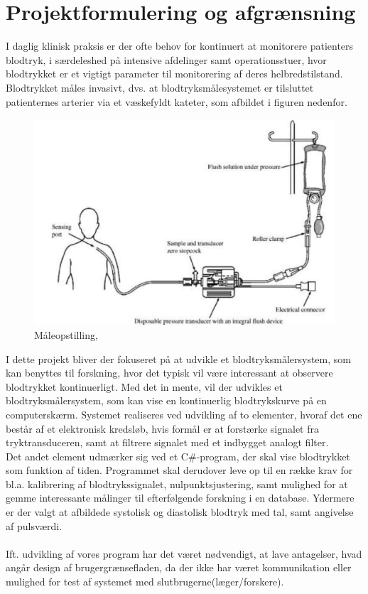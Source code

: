 \chapter{Projektformulering og afgrænsning}
I daglig klinisk praksis er der ofte behov for kontinuert at monitorere patienters blodtryk, i særdeleshed på intensive afdelinger samt operationsstuer, hvor blodtrykket er et vigtigt parameter til monitorering af deres helbredstilstand. \\
Blodtrykket måles invasivt, dvs. at blodtryksmålesystemet er tilsluttet patienternes arterier via et væskefyldt kateter, som afbildet i figuren nedenfor.
\begin{figure}[H]
	\centering
	\includegraphics[width=1\textwidth]{Figurer/Snip20151207_50}
	\caption{Måleopstilling, \protect\cite[s. 296]{Billed for invasiv blodtryksmaling}}
\end{figure}

I dette projekt bliver der fokuseret på at udvikle et blodtryksmålersystem, som kan benyttes til forskning, hvor det typisk vil være interessant at observere blodtrykket kontinuerligt. 
Med det in mente, vil der udvikles et blodtryksmålersystem, som kan vise en kontinuerlig blodtrykskurve på en computerskærm.
Systemet realiseres ved udvikling af to elementer, hvoraf det ene består af et elektronisk kredsløb, hvis formål er at forstærke signalet fra tryktransduceren, samt at filtrere signalet med et indbygget analogt filter.\\
Det andet element udmærker sig ved et C\#-program, der skal vise blodtrykket som funktion af tiden. Programmet skal derudover leve op til en række krav for bl.a. kalibrering af blodtrykssignalet, nulpunktsjustering, samt mulighed for at gemme interessante målinger til efterfølgende forskning i en database.
Ydermere er der valgt at afbildede systolisk og diastolisk blodtryk med tal, samt angivelse af pulsværdi.\\\\
Ift. udvikling af vores program har det været nødvendigt, at lave antagelser, hvad angår design af brugergrænsefladen, da der ikke har været kommunikation eller mulighed for test af systemet med slutbrugerne(læger/forskere). 


